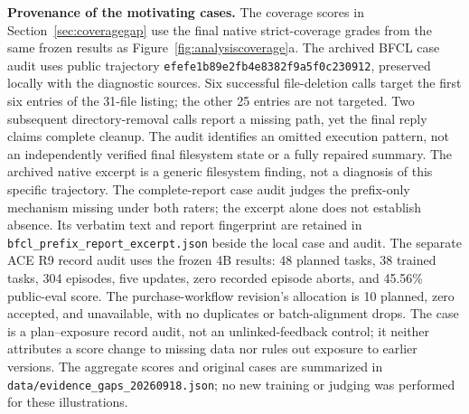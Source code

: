 \textbf{Provenance of the motivating cases.}\quad
The coverage scores in Section~\ref{sec:coveragegap} use the final native
strict-coverage grades from the same frozen results as Figure~\ref{fig:analysiscoverage}a.
The archived BFCL case audit uses public trajectory
\texttt{efefe1b89e2fb4e8382f9a5f0c230912}, preserved locally with the diagnostic
sources. Six successful file-deletion calls target the first six entries of
the 31-file listing; the other 25 entries are not targeted. Two subsequent
directory-removal calls report a missing path, yet the final reply claims
complete cleanup. The audit identifies an omitted execution pattern, not an independently
verified final filesystem state or a fully repaired summary.
The archived native excerpt is a generic filesystem finding, not a diagnosis
of this specific trajectory. The complete-report case audit judges the
prefix-only mechanism missing under both raters; the excerpt alone does not
establish absence. Its verbatim text and report fingerprint are retained in
\texttt{bfcl\_prefix\_report\_excerpt.json} beside the local case and audit.
The separate ACE R9 record audit uses the frozen 4B results: 48 planned tasks, 38 trained
tasks, 304 episodes, five updates, zero recorded episode aborts, and 45.56\%
public-eval score. The purchase-workflow revision's allocation is 10 planned,
zero accepted, and unavailable, with no duplicates or batch-alignment drops.
The case is a plan--exposure record audit, not an unlinked-feedback control;
it neither attributes a score change to missing data nor rules out exposure
to earlier versions. The aggregate scores and original cases are summarized in
\texttt{data/evidence\_gaps\_20260918.json}; no new training or judging was
performed for these illustrations.
